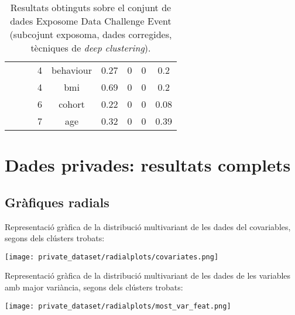 \documentclass[CAT,BIB]{TFUOC}%
\begin{document}
\begin{table}
\begin{tabular}{@{}ccccccccc@{}}
            &  &  & 4 & behaviour & 0.27 & 0 & 0 & 0.2 \\
            &  &  & 4 & bmi & 0.69 & 0 & 0 & 0.2 \\
            &  &  & 6 & cohort & 0.22 & 0 & 0 & 0.08 \\
            &  &  & 7 & age & 0.32 & 0 & 0 & 0.39 \\ \bottomrule
        \end{tabular}
        \caption[Exposome Data Challenge Event: resultats - part 10]{
            Resultats obtinguts sobre el conjunt de dades Exposome Data Challenge Event
            (subcojunt exposoma, dades corregides, tècniques de \textit{deep clustering}).
        }
        \label{t:results_exposome10}
    \end{table}


\chapter{Dades privades: resultats complets}

    \section{Gràfiques radials}

    Representació gràfica de la distribució multivariant
    de les dades del covariables,
    segons dels clústers trobats:

    \texttt{[image: private\_dataset/radialplots/covariates.png]}

    Representació gràfica de la distribució multivariant
    de les dades de les variables amb major variància,
    segons dels clústers trobats:

    \texttt{[image: private\_dataset/radialplots/most\_var\_feat.png]}

%
%
\end{document}
